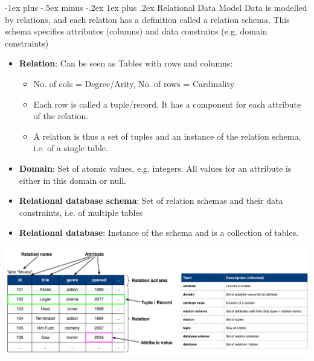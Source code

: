 \documentclass[12pt, landscape]{article}
\makeatletter
\renewcommand{\subsubsection}{\@startsection{subsubsection}{3}{0.1mm}%
                                {-1ex plus -.5ex minus -.2ex}%
                                {1ex plus .2ex}%
                                {\normalfont\small\bfseries}}
\makeatother
\begin{document}
\begin{multicols*}{3}
{\subsubsection{Relational Data Model}
Data is modelled by relations, and each relation has a definition called a relation schema. This schema specifies attributes (columns) and data constrains (e.g. domain constraints)
\begin{itemize}
	\item \textbf{Relation}: Can be seen as Tables with rows and columns:
	\begin{itemize}
		\item No. of cols = Degree/Arity, No. of rows = Cardinality
		\item Each row is called a tuple/record. It has a component for each attribute of the relation.
		\item A relation is thus a set of tuples and an instance of the relation schema, i.e. of a single table.
	\end{itemize}
	\item \textbf{Domain}: Set of atomic values, e.g. integers. All values for an attribute is either in this domain or null.
	\item \textbf{Relational database schema}: Set of relation schemas and their data constraints, i.e. of multiple tables
	\item \textbf{Relational database}:  Instance of the schema and is a collection of tables.
\end{itemize}
\centerline{\includegraphics[width=1 \linewidth]{relationalterms}}

}
\end{multicols*}
\end{document}
